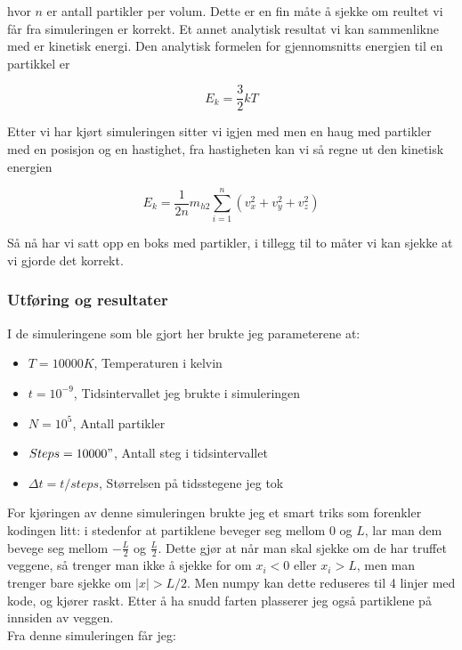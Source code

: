 \documentclass[a4paper,norsk,11pt,twoside]{article}
\begin{document}
hvor $n$ er antall partikler per volum. Dette er en fin måte å sjekke om reultet vi får fra simuleringen er korrekt. Et annet analytisk resultat vi kan sammenlikne med er kinetisk energi. Den analytisk formelen for gjennomsnitts energien til en partikkel er

\begin{equation}
E_k = \frac{3}{2}kT
\end{equation}

Etter vi har kjørt simuleringen sitter vi igjen med men en haug med partikler med en posisjon og en hastighet, fra hastigheten kan vi så regne ut den kinetisk energien

\begin{equation}
E_k = \frac{1}{2n}m_{h2}\sum\limits_{i=1}^{n}(v_x^{2} + v_y^{2} + v_z^{2})
\end{equation}

Så nå har vi satt opp en boks med partikler, i tillegg til to måter vi kan sjekke at vi gjorde det korrekt.

\subsubsection{Utføring og resultater}

I de simuleringene som ble gjort her brukte jeg parameterene at:
\begin{itemize}
\item $T = 10000K$, Temperaturen i kelvin
\item $t = 10^{-9}$, Tidsintervallet jeg brukte i simuleringen
\item $N = 10^{5}$, Antall partikler
\item $Steps = 10000"$, Antall steg i tidsintervallet
\item $\Delta t = t/steps$, Størrelsen på tidsstegene jeg tok
\end{itemize}

For kjøringen av denne simuleringen brukte jeg et smart triks som forenkler kodingen litt: i stedenfor at partiklene beveger seg mellom $0$ og $L$, lar man dem bevege seg mellom $-\frac{L}{2}$ og $\frac{L}{2}$. Dette gjør at når man skal sjekke om de har truffet veggene, så trenger man ikke å sjekke for om $x_i < 0$ eller $x_i > L$, men man trenger bare sjekke om $|x| > L/2$. Men numpy kan dette reduseres til 4 linjer med kode, og kjører raskt. Etter å ha snudd farten plasserer jeg også partiklene på innsiden av veggen. \\

Fra denne simuleringen får jeg:
\end{document}
